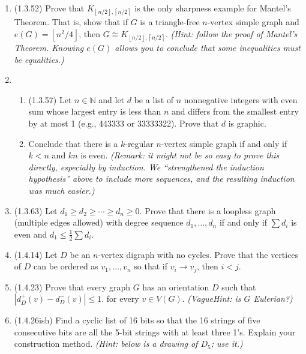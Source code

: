 \documentclass[11pt]{amsart}
\newcommand{\ceil}[1]{\left\lceil#1\right\rceil}
\newcommand{\floor}[1]{\left\lfloor#1\right\rfloor}
\begin{document}
\begin{enumerate}
\item (1.3.52)  Prove that $K_{\floor{n/2},\ceil{n/2}}$ is the only sharpness example for Mantel's Theorem.  That is, show that if $G$ is a triangle-free $n$-vertex simple graph and $e(G)=\floor{n^2/4}$, then $G\cong K_{\floor{n/2},\ceil{n/2}}$.  \textit{(Hint: follow the proof of Mantel's Theorem.  Knowing $e(G)$ allows you to conclude that some inequalities must be equalities.)}

\item 
\begin{enumerate}
\item (1.3.57)  Let $n\in\mathbb{N}$ and let $d$ be a list of $n$ nonnegative integers with even sum whose largest entry is less than $n$ and differs from the smallest entry by at most 1 (e.g., 443333 or 33333322).  Prove that $d$ is graphic.
\item Conclude that there is a $k$-regular $n$-vertex simple graph if and only if $k<n$ and $kn$ is even.  \textit{(Remark: it might not be so easy to prove this directly, especially by induction.  We  ``strengthened the induction hypothesis'' above to include more sequences, and the resulting induction was much easier.)}
\end{enumerate}

\item (1.3.63)  Let $d_1\geq d_2 \geq \dotsb \geq d_n \geq 0$.  Prove that there is a loopless graph (multiple edges allowed) with degree sequence $d_1, \dotsc, d_n$ if and only if $\sum d_i$ is even and $d_1\leq \frac12 \sum d_i$.

\medskip

\item (1.4.14) Let $D$ be an $n$-vertex digraph with no cycles.  Prove that the vertices of $D$ can be ordered as $v_1, \dotsc, v_n$ so that if $v_i\to v_j$, then $i<j$.

\item (1.4.23)   Prove that every graph $G$ has an orientation $D$ such that $\left|d^+_D(v)-d^-_D(v)\right|\leq1$. for every $v\in V(G)$.  \textit{(VagueHint\texttrademark: is $G$ Eulerian?)}

\item (1.4.26ish) Find a cyclic list of 16 bits so that the 16 strings of five consecutive bits are all the 5-bit strings with at least three 1's.  Explain your construction method.  \emph{(Hint: below is a drawing of $D_5$; use it.)}

\end{enumerate}
\end{document}
